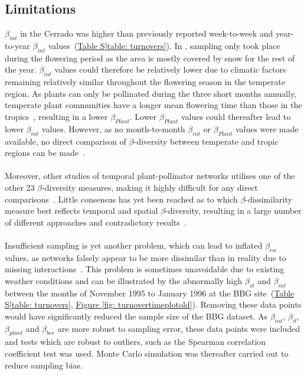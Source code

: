 \documentclass[11pt]{article}
\begin{document}
\subsection{Limitations}

$\beta_{int}$ in the Cerrado was higher than previously reported week-to-week and year-to-year $\beta_{int}$ values~\citep{CaraDonna2017}(\hyperref[table: turnovers]{Table S\ref{table: turnovers}}). In \cite{CaraDonna2017}, sampling only took place during the flowering period as the area is mostly covered by snow for the rest of the year. $\beta_{int}$ values could therefore be relatively lower due to climatic factors remaining relatively similar throughout the flowering season in the temperate region. As plants can only be pollinated during the three short months annually, temperate plant communities have a longer mean flowering time than those in the tropics~\citep{Bawa1990}, resulting in a lower $\beta_{Plant}$. Lower $\beta_{Plant}$ values could thereafter lead to lower $\beta_{int}$ values. However, as no month-to-month $\beta_{int}$ or $\beta_{Plant}$ values were made available, no direct comparison of $\beta$-diversity between temperate and tropic regions can be made~\citep{CaraDonna2017}. \\
\\
Moreover, other studies of temporal plant-pollinator networks utilises one of the other 23 $\beta$-diversity measures, making it highly difficult for any direct comparisons~\citep{BASILIO2006, Alarcon2008, Olesen2008, Burkle2013}. Little consensus has yet been reached as to which $\beta$-dissimilarity measure best reflects temporal and spatial $\beta$-diversity, resulting in a large number of different approaches and contradictory results~\citep{Koleff2003, Poisot2015}.\\
\\
Insufficient sampling is yet another problem, which can lead to inflated $\beta_{rw}$ values, as networks falsely appear to be more dissimilar than in reality due to missing interactions~\citep{Vazquez2007, Dormann2009, Poisot2012a}. This problem is sometimes unavoidable due to existing weather conditions and can be illustrated by the abnormally high $\beta_{st}$ and $\beta_{int}$ between the months of November 1995 to January 1996 at the BBG site~(\hyperref[table: turnovers]{Table S\ref{table: turnovers}}, \hyperref[fig: turnovertimeplotold]{Figure \ref{fig: turnovertimeplotold}}). Removing these data points would have significantly reduced the sample size of the BBG dataset. As $\beta_{int}$, $\beta_{S}$, $\beta_{plant}$ and $\beta_{bee}$ are more robust to sampling error, these data points were included and tests which are robust to outliers, such as the Spearman correlation coefficient test was used. Monte Carlo simulation was thereafter carried out to reduce sampling bias.\\
\end{document}
